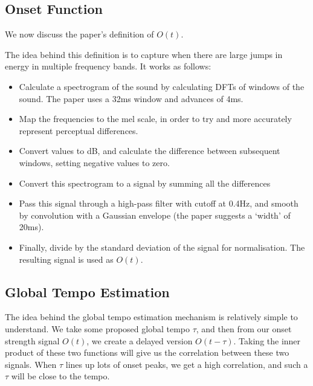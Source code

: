 \documentclass[12pt]{article}
\begin{document}
\subsection{Onset Function}

We now discuss the paper's definition of $O(t)$.

The idea behind this definition is to capture when there are large jumps in energy in multiple frequency bands. It works as follows:

\begin{itemize}
    \item
        Calculate a spectrogram of the sound by calculating DFTs of windows of the sound. The paper uses a 32ms window and advances of 4ms.

    \item
        Map the frequencies to the mel scale, in order to try and more accurately represent perceptual differences.

    \item
        Convert values to dB, and calculate the difference between subsequent windows, setting negative values to zero.

    \item
        Convert this spectrogram to a signal by summing all the differences

    \item
        Pass this signal through a high-pass filter with cutoff at 0.4Hz, and smooth by convolution with a Gaussian envelope (the paper suggests a `width' of 20ms).

    \item
        Finally, divide by the standard deviation of the signal for normalisation. The resulting signal is used as $O(t)$.
\end{itemize}

\subsection{Global Tempo Estimation}


The idea behind the global tempo estimation mechanism is relatively simple to understand. We take some proposed global tempo $\tau$, and then from our onset strength signal $O(t)$, we create a delayed version $O(t-\tau)$. Taking the inner product of these two functions will give us the correlation between these two signals. When $\tau$ lines up lots of onset peaks, we get a high correlation, and such a $\tau$ will be close to the tempo.
\end{document}
